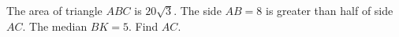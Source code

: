 The area of triangle $ABC$ is $20\sqrt{3}$. The side $AB=8$ is greater than half of side $AC$. The median $BK=5$. Find $AC$.
